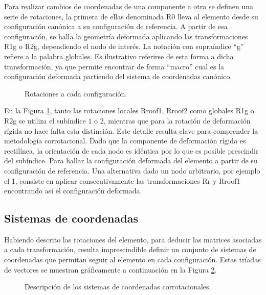 Para realizar cambios  de coordenadas de una componente a otra se definen una serie de rotaciones, la primera de ellas denominada \gls{R0} lleva al elemento desde su configuración canónica a su configuración de referencia. A partir de esa configuración, se halla la geometría deformada aplicando las transformaciones \gls{R1g} o \gls{R2g}, dependiendo el nodo de interés. La notación con supraíndice ``g'' refiere a la palabra globales. Es ilustrativo referirse de esta forma a dicha transformación, ya que permite encontrar de forma ``macro'' cual es la configuración deformada partiendo del sistema de coordenadas canónico.

\begin{figure}[htbp]
	\centering
	\def\svgwidth{100mm}
	
	\caption{Rotaciones a cada configuración.}
	\label{fig:PRE:IlusCorrotRot}
\end{figure}

En la Figura \ref{fig:PRE:IlusCorrotRot}, tanto las rotaciones locales \gls{Rroof1}, \gls{Rroof2} como globales  \gls{R1g} o \gls{R2g} se utiliza el subíndice $1$ o $2$, mientras que para la rotación de deformación rígida no hace falta esta distinción. Este detalle resulta clave para comprender la metodología corrotacional. Dado que la componente de deformación rígida es rectilínea, la orientación de cada nodo es idéntica por lo que es posible prescindir del subíndice. Para hallar la configuración deformada del elemento a partir de su configuración de referencia. Una alternativa dado un nodo arbitrario, por ejemplo el 1, consiste en aplicar consecutivamente las transformaciones \gls{Rr} y \gls{Rroof1} encontrando así el configuración deformada.

\subsection{Sistemas de coordenadas}
Habiendo descrito las rotaciones del elemento, para deducir las matrices asociadas a cada transformación, resulta imprescindible definir un conjunto de sistemas de coordenadas que permitan seguir al elemento en cada configuración. Estas tríadas de vectores se muestran gráficamente a continuación en la Figura \ref{fig:PRE:IlusCorrot}.

\begin{figure}[htbp]
	\centering
	\def\svgwidth{100mm}
	
	\caption{Descripción de los sistemas de coordenadas corrotacionales.}
	\label{fig:PRE:IlusCorrot}
\end{figure}


